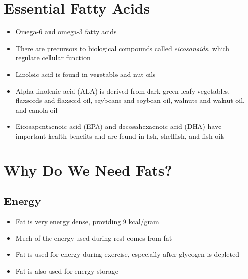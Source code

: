 \documentclass[title={Chapter 5}]{fdsn201notes}
\begin{document}
\section{Essential Fatty Acids}\label{sec:essential-fatty-acids}
\begin{itemize}
	\item Omega-6 and omega-3 fatty acids
	\item There are precursors to biological compounds called \textit{eicosanoids}, which regulate cellular function
	\item Linoleic acid is found in vegetable and nut oils
	\item Alpha-linolenic acid (ALA) is derived from dark-green leafy vegetables, flaxseeds and flaxseed oil, soybeans and soybean oil, walnuts and walnut oil, and canola oil
	\item Eicosapentaenoic acid (EPA) and docosahexaenoic acid (DHA) have important health benefits and are found in fish, shellfish, and fish oils
\end{itemize}

\section{Why Do We Need Fats?}\label{sec:why-do-we-need-fats?}
\subsection{Energy}\label{subsec:energy}
\begin{itemize}
	\item Fat is very energy dense, providing 9 kcal/gram
	\item Much of the energy used during rest comes from fat
	\item Fat is used for energy during exercise, especially after glycogen is depleted
	\item Fat is also used for energy storage
\end{itemize}
\end{document}
